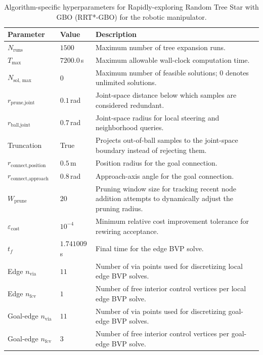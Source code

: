 \begin{table}[htbp]
    \centering
    \caption{Algorithm-specific hyperparameters for Rapidly-exploring Random Tree Star with GBO (RRT*-GBO) for the robotic manipulator.}
    \label{tab:params_rrt_gbo_robot}
    \begin{tabularx}{\textwidth}{l l X}
        \toprule
        \textbf{Parameter} & \textbf{Value} & \textbf{Description} \\
        \midrule
        $N_{\text{runs}}$ & $1500$ & Maximum number of tree expansion runs. \\
        $T_{\max}$ & $7200.0$\,s & Maximum allowable wall-clock computation time. \\
        $N_{\text{sol, max}}$ & $0$ & Maximum number of feasible solutions; $0$ denotes unlimited solutions. \\
        $r_{\text{prune,joint}}$ & $0.1$\,rad & Joint-space distance below which samples are considered redundant. \\
        $r_{\text{ball,joint}}$ & $0.7$\,rad & Joint-space radius for local steering and neighborhood queries. \\
        Truncation & True & Projects out-of-ball samples to the joint-space boundary instead of rejecting them. \\
        $r_{\text{connect,position}}$ & $0.5$\,m & Position radius for the goal connection. \\
        $r_{\text{connect,approach axis}}$ & $0.8$\,rad & Approach-axis angle for the goal connection. \\
        $W_{\text{prune}}$ & $20$ & Pruning window size for tracking recent node addition attempts to dynamically adjust the pruning radius. \\
        $\varepsilon_{\text{cost}}$ & $10^{-4}$ & Minimum relative cost improvement tolerance for rewiring acceptance. \\
        $t_f$ & $1.741009$\,s & Final time for the edge BVP solve. \\
        Edge $n_{\text{via}}$ & $11$ & Number of via points used for discretizing local edge BVP solves. \\
        Edge $n_{\text{fcv}}$ & $1$ & Number of free interior control vertices per local edge BVP solve. \\
        Goal-edge $n_{\text{via}}$ & $11$ & Number of via points used for discretizing goal-edge BVP solves. \\
        Goal-edge $n_{\text{fcv}}$ & $3$ & Number of free interior control vertices per goal-edge BVP solve. \\
        \bottomrule
    \end{tabularx}
\end{table}

